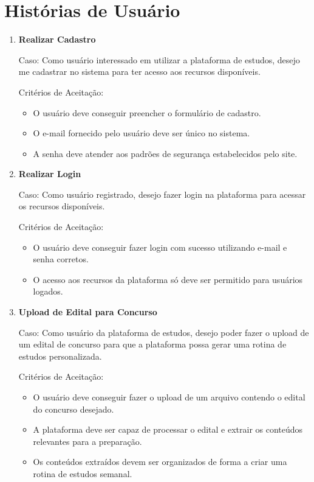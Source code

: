 \section{Histórias de Usuário} 

\begin{enumerate}[label=\textbf{\arabic*.}]
    
    \item \textbf{Realizar Cadastro} \newline
    
    Caso: Como usuário interessado em utilizar a plataforma de estudos, desejo me cadastrar no sistema para ter acesso aos recursos disponíveis.

    Critérios de Aceitação:
    \begin{itemize}
        \item O usuário deve conseguir preencher o formulário de cadastro.
        \item O e-mail fornecido pelo usuário deve ser único no sistema.
        \item A senha deve atender aos padrões de segurança estabelecidos pelo site.
    \end{itemize} 

    \newpage
    \item \textbf{Realizar Login} \newline

    Caso: Como usuário registrado, desejo fazer login na plataforma para acessar os recursos disponíveis.

    Critérios de Aceitação:
    \begin{itemize}
        \item O usuário deve conseguir fazer login com sucesso utilizando e-mail e senha corretos.
        \item O acesso aos recursos da plataforma só deve ser permitido para usuários logados.
    \end{itemize}
    
    \item \textbf{Upload de Edital para Concurso} \newline
    
    Caso: Como usuário da plataforma de estudos, desejo poder fazer o upload de um edital de concurso para que a plataforma possa gerar uma rotina de estudos personalizada.

    Critérios de Aceitação:
    \begin{itemize}
        \item O usuário deve conseguir fazer o upload de um arquivo contendo o edital do concurso desejado.
        \item A plataforma deve ser capaz de processar o edital e extrair os conteúdos relevantes para a preparação.
        \item Os conteúdos extraídos devem ser organizados de forma a criar uma rotina de estudos semanal.
    \end{itemize}


\end{enumerate}
